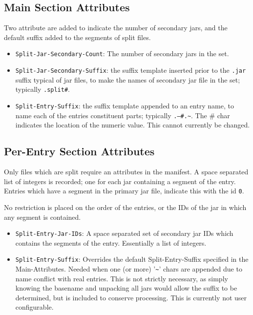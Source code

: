 \documentclass[a4paper, 12pt, pdftex]{report}
\begin{document}
\subsection{Main Section Attributes}

Two attribute are added to indicate the number of secondary jars, and
the default suffix added to the segments of split files.

\begin{itemize}
  \item \texttt{Split-Jar-Secondary-Count}: The number of secondary jars
        in the set.
  \item \texttt{Split-Jar-Secondary-Suffix}: the suffix template
        inserted prior to the \texttt{.jar} suffix typical of jar
        files, to make the names of secondary jar file in the set;
        typically \texttt{.split\#}.
  \item \texttt{Split-Entry-Suffix}: the suffix template appended to
        an entry name, to name each of the entries constituent parts;
        typically \texttt{.---\#.\~{}}. The \# char indicates the
        location of the numeric value.  This cannot currently be
        changed.
\end{itemize}

\subsection{Per-Entry Section Attributes}

Only files which are split require an attributes in the manifest. A
space separated list of integers is recorded; one for each jar
containing a segment of the entry. Entries which have a segment in the
primary jar file, indicate this with the id \texttt{0}.

No restriction is placed on the order of the entries, or the IDs of the
jar in which any segment is contained.

\begin{itemize}
  \item \texttt{Split-Entry-Jar-IDs}: A space separated set of
        secondary jar IDs which contains the segments of the
        entry. Essentially a list of integers.
  \item \texttt{Split-Entry-Suffix}: Overrides the default
        Split-Entry-Suffix specified in the Main-Attributes. Needed
        when one (or more) '\texttt{\~{}}' chars are appended due to name
        conflict with real entries.  This is not strictly necessary,
        as simply knowing the basename and unpacking all jars would
        allow the suffix to be determined, but is included to conserve
        processing. This is currently not user configurable.
\end{itemize}
\end{document}
